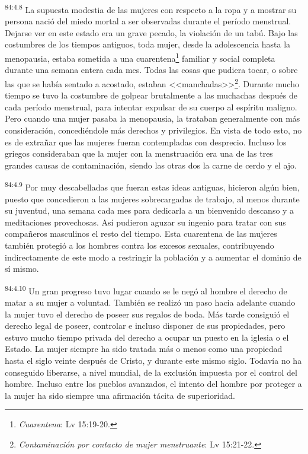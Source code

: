 \documentclass[twoside, 11pt]{book}
\begin{document}
\par
\textsuperscript{84:4.8} La supuesta modestia de las mujeres con respecto a la ropa y a mostrar su persona nació del miedo mortal a ser observadas durante el período menstrual. Dejarse ver en este estado era un grave pecado, la violación de un tabú. Bajo las costumbres de los tiempos antiguos, toda mujer, desde la adolescencia hasta la menopausia, estaba sometida a una cuarentena\footnote{\textit{Cuarentena}: Lv 15:19-20.} familiar y social completa durante una semana entera cada mes. Todas las cosas que pudiera tocar, o sobre las que se había sentado a acostado, estaban <<manchadas>>\footnote{\textit{Contaminación por contacto de mujer menstruante}: Lv 15:21-22.}. Durante mucho tiempo se tuvo la costumbre de golpear brutalmente a las muchachas después de cada período menstrual, para intentar expulsar de su cuerpo al espíritu maligno. Pero cuando una mujer pasaba la menopausia, la trataban generalmente con más consideración, concediéndole más derechos y privilegios. En vista de todo esto, no es de extrañar que las mujeres fueran contempladas con desprecio. Incluso los griegos consideraban que la mujer con la menstruación era una de las tres grandes causas de contaminación, siendo las otras dos la carne de cerdo y el ajo.

\par
\textsuperscript{84:4.9} Por muy descabelladas que fueran estas ideas antiguas, hicieron algún bien, puesto que concedieron a las mujeres sobrecargadas de trabajo, al menos durante su juventud, una semana cada mes para dedicarla a un bienvenido descanso y a meditaciones provechosas. Así pudieron aguzar su ingenio para tratar con sus compañeros masculinos el resto del tiempo. Esta cuarentena de las mujeres también protegió a los hombres contra los excesos sexuales, contribuyendo indirectamente de este modo a restringir la población y a aumentar el dominio de sí mismo.

\par
\textsuperscript{84:4.10} Un gran progreso tuvo lugar cuando se le negó al hombre el derecho de matar a su mujer a voluntad. También se realizó un paso hacia adelante cuando la mujer tuvo el derecho de poseer sus regalos de boda. Más tarde consiguió el derecho legal de poseer, controlar e incluso disponer de sus propiedades, pero estuvo mucho tiempo privada del derecho a ocupar un puesto en la iglesia o el Estado. La mujer siempre ha sido tratada más o menos como una propiedad hasta el siglo veinte después de Cristo, y durante este mismo siglo. Todavía no ha conseguido liberarse, a nivel mundial, de la exclusión impuesta por el control del hombre. Incluso entre los pueblos avanzados, el intento del hombre por proteger a la mujer ha sido siempre una afirmación tácita de superioridad.
\end{document}

